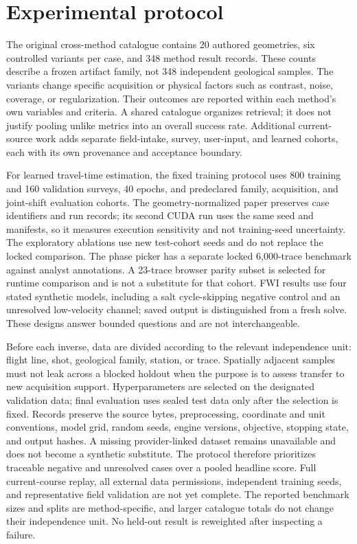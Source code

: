 \section{Experimental protocol}\label{experimental-protocol}

The original cross-method catalogue contains 20 authored geometries,
six controlled variants per case, and 348 method result records. These
counts describe a frozen artifact family, not 348 independent geological
samples. The variants change specific acquisition or physical factors
such as contrast, noise, coverage, or regularization. Their outcomes are
reported within each method's own variables and criteria. A shared
catalogue organizes retrieval; it does not justify pooling unlike
metrics into an overall success rate. Additional current-source work
adds separate field-intake, survey, user-input, and learned cohorts,
each with its own provenance and acceptance boundary.

For learned travel-time estimation, the fixed training protocol uses 800
training and 160 validation surveys, 40 epochs, and predeclared family,
acquisition, and joint-shift evaluation cohorts. The geometry-normalized
paper preserves case identifiers and run records; its second CUDA run
uses the same seed and manifests, so it measures execution sensitivity
and not training-seed uncertainty. The exploratory ablations use new
test-cohort seeds and do not replace the locked comparison. The phase
picker has a separate locked 6,000-trace benchmark against analyst
annotations. A 23-trace browser parity subset is selected for runtime
comparison and is not a substitute for that cohort. FWI results use
four stated synthetic models, including a salt cycle-skipping negative
control and an unresolved low-velocity channel; saved output is
distinguished from a fresh solve. These designs answer bounded
questions and are not interchangeable.

Before each inverse, data are divided according to the relevant
independence unit: flight line, shot, geological family, station, or
trace. Spatially adjacent samples must not leak across a blocked holdout
when the purpose is to assess transfer to new acquisition support.
Hyperparameters are selected on the designated validation data; final
evaluation uses sealed test data only after the selection is fixed.
Records preserve the source bytes, preprocessing, coordinate and unit
conventions, model grid, random seeds, engine versions, objective,
stopping state, and output hashes. A missing provider-linked dataset
remains unavailable and does not become a synthetic substitute. The
protocol therefore prioritizes traceable negative and unresolved cases
over a pooled headline score. Full current-course replay, all external
data permissions, independent training seeds, and representative field
validation are not yet complete. The reported benchmark sizes and splits
are method-specific, and larger catalogue totals do not change their
independence unit. No held-out result is reweighted after inspecting a
failure.


